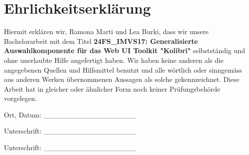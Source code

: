 \chapter*{Ehrlichkeitserklärung}

Hiermit erklären wir, Ramona Marti und Lea Burki, dass wir unsere Bachelorarbeit mit dem Titel 
\textbf{24FS\_IMVS17: Generalisierte Auswahlkomponente für das Web UI Toolkit "Kolibri"} selbstständig und 
ohne unerlaubte Hilfe angefertigt haben. Wir haben keine anderen als die angegebenen Quellen und Hilfsmittel 
benutzt und alle wörtlich oder sinngemäss aus anderen Werken übernommenen Aussagen als solche gekennzeichnet. 
Diese Arbeit hat in gleicher oder ähnlicher Form noch keiner Prüfungsbehörde vorgelegen.
\newline \newline \newline \newline

\begin{center} 
    Ort, Datum: \_\_\_\_\_\_\_\_\_\_\_\_\_\_\_\_\_\_
    \newline \newline \newline \newline 
    
    Unterschrift: \_\_\_\_\_\_\_\_\_\_\_\_\_\_\_\_\_\_
    \newline \newline \newline \newline 

    Unterschrift: \_\_\_\_\_\_\_\_\_\_\_\_\_\_\_\_\_\_
    \newline
\end{center}
